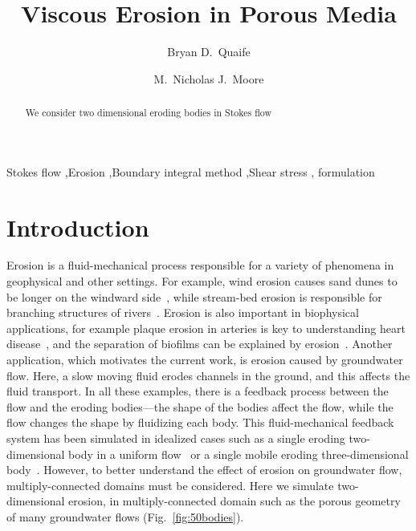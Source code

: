 \documentclass[preprint, 10pt]{elsarticle}
\begin{document}
\title{Viscous Erosion in Porous Media}

\author[Bryan]{Bryan D.~Quaife}
\author[Nick]{M.~Nicholas J.~Moore}
\address[Nick]{Department of Mathematics and Geophysical Fluid Dynamics Institute, Florida State University, Tallahassee, FL, 32306.}
\address[Bryan]{Department of Scientific Computing and Geophysical Fluid Dynamics Institute, Florida State University, Tallahassee, FL, 32306.}

\begin{abstract} 
We consider two dimensional eroding bodies in Stokes flow
\end{abstract}

\begin{keyword}
  Stokes flow \sep Erosion \sep Boundary integral method \sep Shear
  stress \sep {\thL} formulation
\end{keyword}

\maketitle

\section{Introduction\label{s:intro}}
Erosion is a fluid-mechanical process responsible for a variety
of phenomena in geophysical and other settings.  For example,
wind erosion causes sand dunes to be  longer on the windward
side~\cite{han1969}, while stream-bed erosion is responsible for branching structures
of rivers~\cite{coh-dev-sey-yi-szy-rot2015}.  Erosion is
also important in biophysical applications, for example plaque erosion in arteries
is key to understanding heart disease~\cite{sha2002,
gro-gij-van-fer-hat-van-yua-wen2007}, and the separation of biofilms can
be explained by erosion~\cite{pic-van-hei2000}.  Another application,
which motivates the current work, is erosion caused by groundwater flow.
Here, a slow moving fluid erodes channels in the ground, and this
affects the fluid transport.  In all these examples, there is a feedback
process between the flow and the eroding bodies---the shape of the
bodies affect the flow, while the flow changes the shape by fluidizing
each body.  This fluid-mechanical feedback system has been simulated in
idealized cases such as a single eroding two-dimensional body in a
uniform flow~\cite{moo-ris-chi-zha-she2013} or a single mobile eroding
three-dimensional body~\cite{mit-spa2016}. However, to better understand
the effect of erosion on groundwater flow, multiply-connected domains
must be considered.  Here we simulate two-dimensional erosion, in
multiply-connected domain such as the porous geometry of many
groundwater flows (Fig.~\ref{fig:50bodies}).
\end{document}
